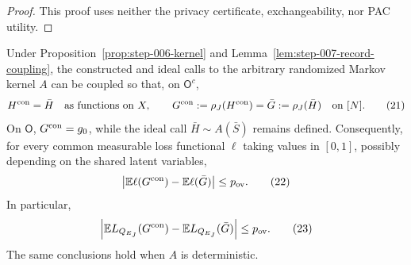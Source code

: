 \begin{proof}
This proof uses neither the privacy certificate, exchangeability, nor
PAC utility.

\end{proof}


\begin{proposition}
\label{prop:step-007-output-transfer}

Under Proposition~\ref{prop:step-006-kernel} and
Lemma~\ref{lem:step-007-record-coupling}, the constructed and ideal
calls to the arbitrary randomized Markov kernel \(A\) can be coupled
so that, on \(\mathsf O^c\),
\[
H^{\rm con}=\bar H
\quad\text{as functions on }X,
\qquad
G^{\rm con}:=\rho_J(H^{\rm con})
=\bar G:=\rho_J(\bar H)
\quad\text{on }[N].
\tag{21}\label{eq:step-007-21}
\]
On \(\mathsf O\), \(G^{\rm con}=g_0\), while the ideal call
\(\bar H\sim A(\bar S)\) remains defined.  Consequently, for every
common measurable loss functional \(\ell\) taking values in
\([0,1]\), possibly depending on the shared latent variables,
\[
\left|
\mathbb E\ell(G^{\rm con})
-\mathbb E\ell(\bar G)
\right|
\le p_{\rm ov}.
\tag{22}\label{eq:step-007-22}
\]
In particular,
\[
\left|
\mathbb E L_{Q_{E_J}}(G^{\rm con})
-\mathbb E L_{Q_{E_J}}(\bar G)
\right|
\le p_{\rm ov}.
\tag{23}\label{eq:step-007-23}
\]
The same conclusions hold when \(A\) is deterministic.

\end{proposition}

